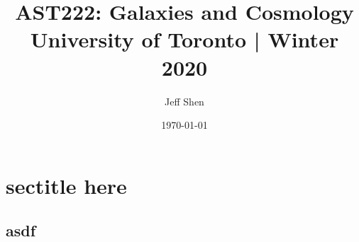 \documentclass[a4paper,10pt]{article}
\begin{document}
\title{AST222: Galaxies and Cosmology\\
    \Large University of Toronto | Winter 2020}
\author{Jeff Shen}
\date{\today}
\maketitle
\tableofcontents



\newpage
\section{sectitle here}

\subsection{asdf}
\end{document}
